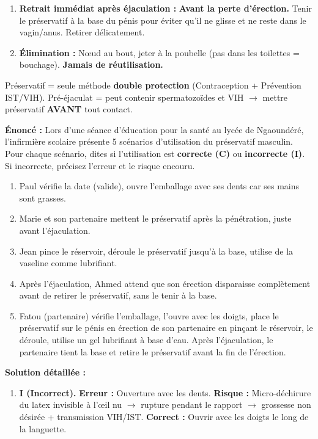 \documentclass[11pt]{article}
\newcommand{\cle}[1]{{\popxbold\color{popdark}#1}}
\begin{document}
\begin{methode}
\begin{enumerate}
        \item \textbf{Retrait immédiat après éjaculation :} \textbf{Avant la perte d'érection.} Tenir le préservatif à la base du pénis pour éviter qu'il ne glisse et ne reste dans le vagin/anus. Retirer délicatement.
        \item \textbf{Élimination :} Nœud au bout, jeter à la poubelle (pas dans les toilettes = bouchage). \textbf{Jamais de réutilisation.}
    \end{enumerate}
    \cle{Préservatif} = seule méthode \textbf{double protection} (Contraception + Prévention IST/VIH). \cle{Pré-éjaculat} = peut contenir spermatozoïdes et VIH $\rightarrow$ mettre préservatif \textbf{AVANT} tout contact.
\end{methode}

\begin{exoresolu}
    \textbf{Énoncé :} Lors d'une séance d'éducation pour la santé au lycée de Ngaoundéré, l'infirmière scolaire présente 5 scénarios d'utilisation du préservatif masculin. Pour chaque scénario, dites si l'utilisation est \textbf{correcte (C)} ou \textbf{incorrecte (I)}. Si incorrecte, précisez l'erreur et le risque encouru.
    \begin{enumerate}
        \item Paul vérifie la date (valide), ouvre l'emballage avec ses dents car ses mains sont grasses.
        \item Marie et son partenaire mettent le préservatif après la pénétration, juste avant l'éjaculation.
        \item Jean pince le réservoir, déroule le préservatif jusqu'à la base, utilise de la vaseline comme lubrifiant.
        \item Après l'éjaculation, Ahmed attend que son érection disparaisse complètement avant de retirer le préservatif, sans le tenir à la base.
        \item Fatou (partenaire) vérifie l'emballage, l'ouvre avec les doigts, place le préservatif sur le pénis en érection de son partenaire en pinçant le réservoir, le déroule, utilise un gel lubrifiant à base d'eau. Après l'éjaculation, le partenaire tient la base et retire le préservatif avant la fin de l'érection.
    \end{enumerate}
    \tcblower
    \textbf{Solution détaillée :}
    \begin{enumerate}
        \item \textbf{I (Incorrect).} \textbf{Erreur :} Ouverture avec les dents. \textbf{Risque :} Micro-déchirure du latex invisible à l'œil nu $\rightarrow$ rupture pendant le rapport $\rightarrow$ grossesse non désirée + transmission VIH/IST. \textbf{Correct :} Ouvrir avec les doigts le long de la languette.

\end{enumerate}
\end{exoresolu}
\end{document}
